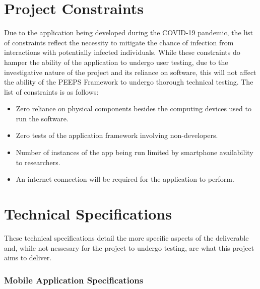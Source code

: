 \section{Project Constraints}
Due to the application being developed during the COVID-19 pandemic, the list of constraints reflect the necessity to mitigate the chance of infection from interactions with potentially infected individuals. While these constraints do hamper the ability of the application to undergo user testing, due to the investigative nature of the project and its reliance on software, this will not affect the ability of the PEEPS Framework to undergo thorough technical testing. The list of constraints is as follows:

\begin{itemize}
    \item Zero reliance on physical components besides the computing devices used to run the software.
    \item Zero tests of the application framework involving non-developers.
    \item Number of instances of the app being run limited by smartphone availability to researchers.
    \item An internet connection will be required for the application to perform.
\end{itemize}

\section{Technical Specifications}
These technical specifications detail the more specific aspects of the deliverable and, while not nessesary for the project to undergo testing, are what this project aims to deliver.

\subsubsection{Mobile Application Specifications}

